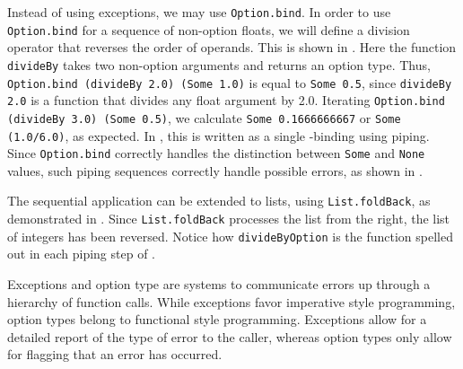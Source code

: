 \documentclass[fsharpnotes.tex]{subfiles}
\begin{document}
Instead of using exceptions, we may use \lstinline{Option.bind}. In order to use \lstinline{Option.bind} for a sequence of non-option floats, we will define a division operator that reverses the order of operands. This is shown in .
%
%
Here the function \lstinline{divideBy} takes two non-option arguments and returns an option type. Thus, \lstinline{Option.bind (divideBy 2.0) (Some 1.0)} is equal to \lstinline{Some 0.5}, since \lstinline{divideBy 2.0} is a function that divides any float argument by 2.0. Iterating \lstinline{Option.bind (divideBy 3.0) (Some 0.5)}, we calculate \lstinline{Some 0.1666666667} or \lstinline{Some (1.0/6.0)}, as expected. In , this is written as a single -binding using piping. Since \lstinline{Option.bind} correctly handles the distinction between \lstinline{Some} and \lstinline{None} values, such piping sequences correctly handle possible errors, as shown in .

The sequential application can be extended to lists, using \lstinline{List.foldBack}, as demonstrated in .
%
%
Since \lstinline{List.foldBack} processes the list from the right, the list of integers has been reversed. Notice how \lstinline{divideByOption} is the function spelled out in each piping step of .

Exceptions and option type are systems to communicate errors up through a hierarchy of function calls. While exceptions favor imperative style programming, option types belong to functional style programming. Exceptions allow for a detailed report of the type of error to the caller, whereas option types only allow for flagging that an error has occurred.

\begin{comment}
  \begin{itemize}
  \item exn type Spec-4.0 Chapter 18.1
  \item Spec-4.0 Section 18.2.
  \item Husk, som if-else skal try-with branches være af samme type. Giv eksempel på parsning af argument til selvdefineret exception. Gå problem med divmed0exception igennem: 3 cases, failsafe værdier, undtagelser, eller option typer.
  \item Extend railway paradigm, \url{https://fsharpforfunandprofit.com/posts/computation-expressions-bind/}
  \item Extend notion of exception heriarchy and relation to catching or not.
  \end{itemize}
\end{comment}
\end{document}
